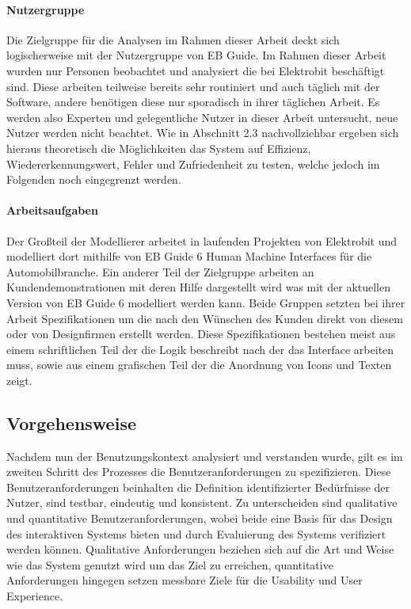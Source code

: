 \paragraph{Nutzergruppe}
Die Zielgruppe für die Analysen im Rahmen dieser Arbeit deckt sich logischerweise mit der Nutzergruppe von EB Guide.
Im Rahmen dieser Arbeit wurden nur Personen beobachtet und analysiert die bei Elektrobit beschäftigt sind.
Diese arbeiten teilweise bereits sehr routiniert und auch täglich mit der Software, andere benötigen diese nur sporadisch in ihrer täglichen Arbeit.
Es werden also Experten und gelegentliche Nutzer in dieser Arbeit untersucht, neue Nutzer werden nicht beachtet.
Wie in Abschnitt 2.3 nachvollziehbar ergeben sich hieraus theoretisch die Möglichkeiten das System auf Effizienz, Wiedererkennungswert, Fehler und Zufriedenheit zu testen, welche jedoch im Folgenden noch eingegrenzt werden.

\paragraph{Arbeitsaufgaben}
Der Großteil der Modellierer arbeitet in laufenden Projekten von Elektrobit und modelliert dort mithilfe von EB Guide 6 Human Machine Interfaces für die Automobilbranche.
Ein anderer Teil der Zielgruppe arbeiten an Kundendemonstrationen mit deren Hilfe dargestellt wird was mit der aktuellen Version von EB Guide 6 modelliert werden kann.
Beide Gruppen setzten bei ihrer Arbeit Spezifikationen um die nach den Wünschen des Kunden direkt von diesem oder von Designfirmen erstellt werden.
Diese Spezifikationen bestehen meist aus einem schriftlichen Teil der die Logik beschreibt nach der das Interface arbeiten muss, sowie aus einem grafischen Teil der die Anordnung von Icons und Texten zeigt.


\subsection{Vorgehensweise}
Nachdem nun der Benutzungskontext analysiert und verstanden wurde, gilt es im zweiten Schritt des Prozesses die Benutzeranforderungen zu spezifizieren.
Diese Benutzeranforderungen beinhalten die Definition identifizierter Bedürfnisse der Nutzer, sind testbar, eindeutig und konsistent.
Zu unterscheiden sind qualitative und quantitative Benutzeranforderungen, wobei beide eine Basis für das Design des interaktiven Systems bieten und durch Evaluierung des Systems verifiziert werden können.
Qualitative Anforderungen beziehen sich auf die Art und Weise wie das System genutzt wird um das Ziel zu erreichen, quantitative Anforderungen hingegen setzen messbare Ziele für die Usability und User Experience.\cite{.f}

